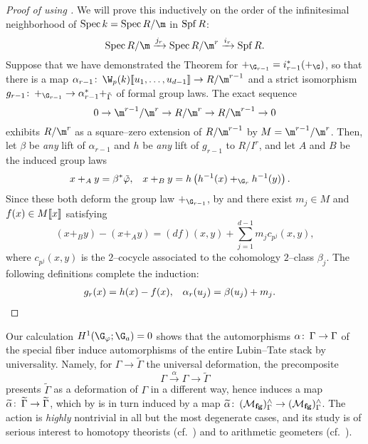 \begin{proof}[Proof of  using ]
We will prove this inductively on the order of the infinitesimal neighborhood of $\Spec k = \Spec R / \m$ in $\operatorname{Spf} R$: \[\Spec R / \m \xrightarrow{j_r} \Spec R/\m^r \xrightarrow{i_r} \Spf R.\]  Suppose that we have demonstrated the Theorem for $+_{\G_{r-1}} = i_{r-1}^* (+_{\G})$, so that there is a map $\alpha_{r-1}\co \W_p(k)\ps{u_1, \ldots, u_{d-1}} \to R/\m^{r-1}$ and a strict isomorphism $g_{r-1}\co +_{\G_{r-1}} \to \alpha_{r-1}^* +_{\tilde \Gamma}$ of formal group laws.  The exact sequence \[0 \to \m^{r-1} / \m^r \to R/\m^r \to R/\m^{r-1} \to 0\] exhibits $R/\m^r$ as a square--zero extension of $R/\m^{r-1}$ by $M = \m^{r-1} / \m^r$.  Then, let $\beta$ be \emph{any} lift of $\alpha_{r-1}$ and $h$ be \emph{any} lift of $g_{r-1}$ to $R/I^r$, and let $A$ and $B$ be the induced group laws
\begin{align*}
x +_A y & = \beta^* \tilde \phi, &
x +_B y & = h\left( h^{-1}(x) +_{\G_r} h^{-1}(y) \right).
\end{align*}
Since these both deform the group law $+_{\G_{r-1}}$, by  and  there exist $m_j \in M$ and $f(x) \in M\llbracket{x}\rrbracket$ satisfying \[(x +_B y) - (x +_A y) = (df)(x, y) + \sum_{j=1}^{d-1} m_j c_{p^j}(x, y),\] where $c_{p^j}(x, y)$ is the $2$--cocycle associated to the cohomology $2$--class $\beta_j$.  The following definitions complete the induction:
\begin{align*}
g_r(x) & = h(x) - f(x), &
\alpha_r(u_j) & = \beta(u_j) + m_j. \qedhere
\end{align*}
\end{proof}

\begin{remark}\label{ActionBySnLiftsToLTn}
Our calculation $H^1(\G_\phi; \G_a) = 0$ shows that the automorphisms $\alpha\colon\thinspace \Gamma \to \Gamma$ of the special fiber induce automorphisms of the entire Lubin--Tate stack by universality.  Namely, for $\Gamma \to \widetilde \Gamma$ the universal deformation, the precomposite \[\Gamma \xrightarrow{\alpha} \Gamma \to \widetilde \Gamma\] presents $\widetilde \Gamma$ as a deformation of $\Gamma$ in a different way, hence induces a map $\widetilde \alpha\colon\thinspace \widetilde \Gamma \to \widetilde \Gamma$, which by  is in turn induced by a map $\widetilde \alpha\colon\thinspace (\mathcal{M}_{\mathbf{fg}})^\wedge_\Gamma \to (\mathcal{M}_{\mathbf{fg}})^\wedge_\Gamma$.  The action is \emph{highly} nontrivial in all but the most degenerate cases, and its study is of serious interest to homotopy theorists (cf.\ ) and to arithmetic geometers (cf.\ ).
\end{remark}


